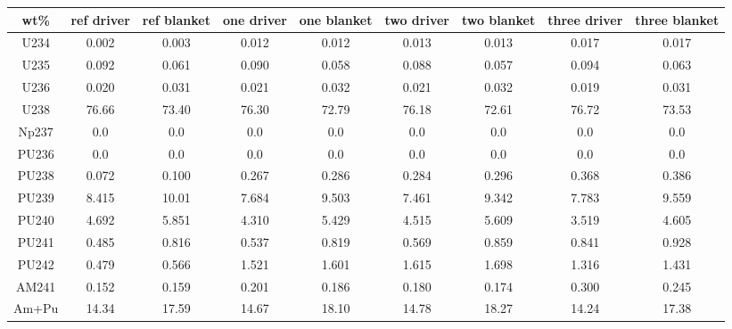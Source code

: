 	\begin{tabular}{ccccccccc}
		\hline
		\textbf{wt\%} & \textbf{ref driver} & \textbf{ref blanket} & \textbf{one driver} & \textbf{one blanket} & \textbf{two driver} & \textbf{two blanket} & \textbf{three driver} & \textbf{three blanket} \\ 		\hline
		U234 & 0.002 & 0.003 & 0.012 & 0.012 & 0.013 & 0.013 & 0.017 & 0.017 \\ 
		U235 & 0.092 & 0.061 & 0.090 & 0.058 & 0.088 & 0.057 & 0.094 & 0.063 \\ 
		U236 & 0.020 & 0.031 & 0.021 & 0.032 & 0.021 & 0.032 & 0.019 & 0.031 \\ 
		U238 & 76.66 & 73.40 & 76.30 & 72.79 & 76.18 & 72.61 & 76.72 & 73.53 \\ 
		Np237 & 0.0 & 0.0 & 0.0 & 0.0 & 0.0 & 0.0 & 0.0 & 0.0 \\ 
		PU236 & 0.0 & 0.0 & 0.0 & 0.0 & 0.0 & 0.0 & 0.0 & 0.0 \\ 
		PU238 & 0.072 & 0.100 & 0.267 & 0.286 & 0.284 & 0.296 & 0.368 & 0.386 \\ 
		PU239 & 8.415 & 10.01 & 7.684 & 9.503 & 7.461 & 9.342 & 7.783 & 9.559 \\ 
		PU240 & 4.692 & 5.851 & 4.310 & 5.429 & 4.515 & 5.609 & 3.519 & 4.605 \\ 
		PU241 & 0.485 & 0.816 & 0.537 & 0.819 & 0.569 & 0.859 & 0.841 & 0.928 \\ 
		PU242 & 0.479 & 0.566 & 1.521 & 1.601 & 1.615 & 1.698 & 1.316 & 1.431 \\ 
		AM241 & 0.152 & 0.159 & 0.201 & 0.186 & 0.180 & 0.174 & 0.300 & 0.245 \\ 
		Am+Pu & 14.34 & 17.59 & 14.67 & 18.10 & 14.78 & 18.27 & 14.24 & 17.38 \\ 
		\hline 
	\end{tabular} 
